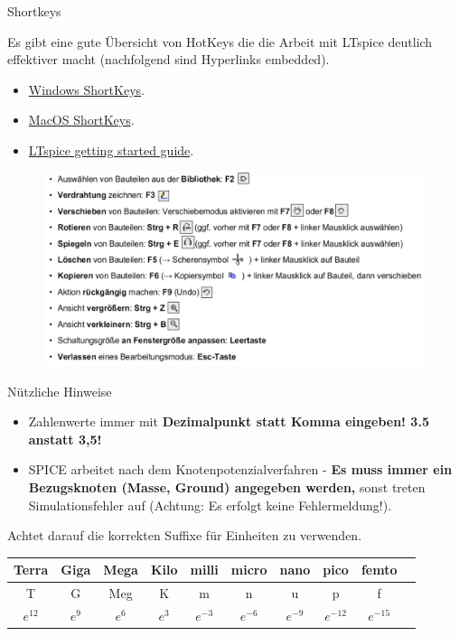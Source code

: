\documentclass{beamer}
\begin{document}
\begin{frame}[t]{Shortkeys}
	
Es gibt eine gute Übersicht von HotKeys die die Arbeit mit LTspice deutlich effektiver macht (nachfolgend sind Hyperlinks embedded).

\begin{itemize}
  \item \href{https://www.analog.com/media/en/simulation-models/spice-models/LTspice_ShortcutFlyer.pdf?modelType=spice-models}{Windows ShortKeys}.
  \item \href{https://www.analog.com/media/en/simulation-models/spice-models/LTspiceShortcutsForMacOSX.pdf?modelType=spice-models}{MacOS ShortKeys}.
  \item \href{https://www.analog.com/media/en/simulation-models/spice-models/LTspiceGettingStartedGuide.pdf?modelType=spice-models}{LTspice getting started guide}.
\end{itemize}

\begin{figure}
  \centering
  \includegraphics[scale=0.25]{pictures/shortkeys.png}
\end{figure}

\end{frame}

\begin{frame}[t]{Nützliche Hinweise}

  \begin{itemize}
    \item Zahlenwerte immer mit \textbf{Dezimalpunkt statt Komma eingeben! 3.5 anstatt 3,5!}
    \item SPICE arbeitet nach dem Knotenpotenzialverfahren - \textbf{Es muss immer ein Bezugsknoten
          (Masse, Ground) angegeben werden,} sonst treten Simulationsfehler auf (Achtung: Es erfolgt
          keine Fehlermeldung!).
  \end{itemize}
  Achtet darauf die korrekten Suffixe für Einheiten zu verwenden.

  \begin{tabular}{| c | c | c | c | c | c | c | c | c | c |}
    \hline
    Terra & Giga & Mega & Kilo & milli & micro & nano & pico & femto \\
    \hline
    T & G & Meg & K & m & n & u & p & f \\
    \hline
    $e^{12}$ & $e^{9}$ & $e^{6}$ &  $e^{3}$ & $e^{-3}$ & $e^{-6}$ & $e^{-9}$ & $e^{-12}$ & $e^{-15}$\\
    \hline
  \end{tabular}
\end{frame}
\end{document}
